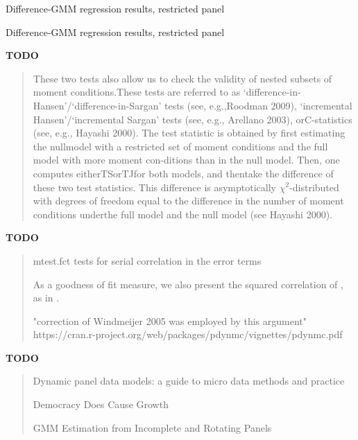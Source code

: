 \documentclass[12pt,a4paper]{article}
\begin{document}
\renewcommand{\arraystretch}{3}
\begin{table}[htbp]
\centering

\label{tab:diffgmmcoeff}
\caption{Difference-GMM regression results, restricted panel}
\end{table}
\renewcommand{\arraystretch}{1}

\renewcommand{\arraystretch}{3}
\begin{table}[htbp]
\centering

\label{tab:diffgmmcoeff}
\caption{Difference-GMM regression results, restricted panel}
\end{table}
\renewcommand{\arraystretch}{1}




\vspace{1cm}
\noindent\textbf{TODO}
\begin{quote}
\cite{roodmanNoteThemeToo2009}
These two tests also allow us to check the validity of nested subsets of moment conditions.These  tests  are  referred  to  as  `difference-in-Hansen'/`difference-in-Sargan'  tests  (see,  e.g.,Roodman 2009), ‘incremental Hansen’/‘incremental Sargan’ tests (see, e.g., Arellano 2003), orC-statistics (see, e.g., Hayashi 2000).  
The test statistic is obtained by first estimating the nullmodel with a restricted set of moment conditions and the full model with more moment con-ditions than in the null model.  Then, one computes eitherTSorTJfor both models, and thentake the difference of these two test statistics.  This difference is asymptotically $\chi^2$-distributed with degrees of freedom equal to the difference in the number of moment conditions underthe full model and the null model (see Hayashi 2000).
\end{quote}

\vspace{1cm}
\noindent\textbf{TODO}
\begin{quote}
mtest.fct tests for serial correlation in the error terms \cite{arellanoTestsSpecificationPanel1991}


As a goodness of fit measure, we also present the squared correlation of , as in \cite{bloomUncertaintyInvestmentDynamics2007}.


"correction of Windmeijer 2005 was employed by this argument" https://cran.r-project.org/web/packages/pdynmc/vignettes/pdynmc.pdf
\end{quote}

\vspace{1cm}
\noindent\textbf{TODO}
\begin{quote}\cite{petrovicUnderlyingCausalFactors2018}
Dynamic panel data models: a guide to micro data methods and practice \cite{bondDynamicPanelData2002}


Democracy Does Cause Growth \cite{acemogluDemocracyDoesCause2019}


GMM Estimation from Incomplete and Rotating Panels \cite{albarranGMMEstimationIncomplete2019}
\end{quote}
\end{document}
